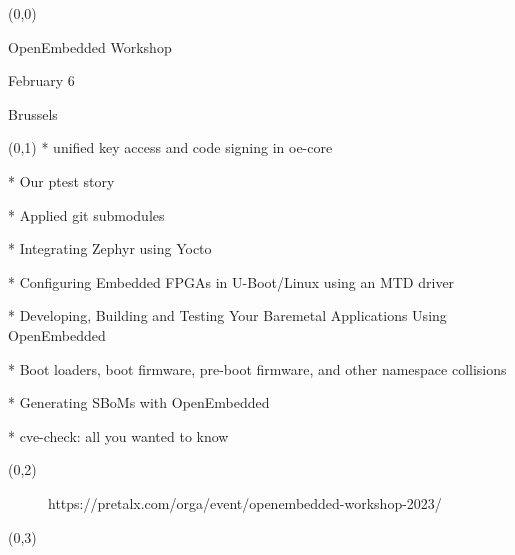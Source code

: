 \documentclass{beamer}
\begin{document}
\begin{textblock}{1}(0,0)
\fontsize{32}{36}\selectfont
\begin{centering}
OpenEmbedded Workshop

February 6

Brussels

\end{centering}
\end{textblock}

\begin{textblock}{1}(0,1)
\huge
* unified key access and code signing in oe-core

* Our ptest story

* Applied git submodules

* Integrating Zephyr using Yocto

* Configuring Embedded FPGAs in U-Boot/Linux using an MTD driver

* Developing, Building and Testing Your Baremetal Applications Using OpenEmbedded

* Boot loaders, boot firmware, pre-boot firmware, and other namespace collisions

* Generating SBoMs with OpenEmbedded

* cve-check: all you wanted to know

\end{textblock}

\begin{textblock}{1}(0,2)

\huge
\begin{figure}
\centering
\caption{https://pretalx.com/orga/event/openembedded-workshop-2023/}

\end{figure}

\end{textblock}

\begin{textblock}{1}(0,3)
\begin{figure}
\centering

\end{figure}
\end{textblock}
\end{document}

